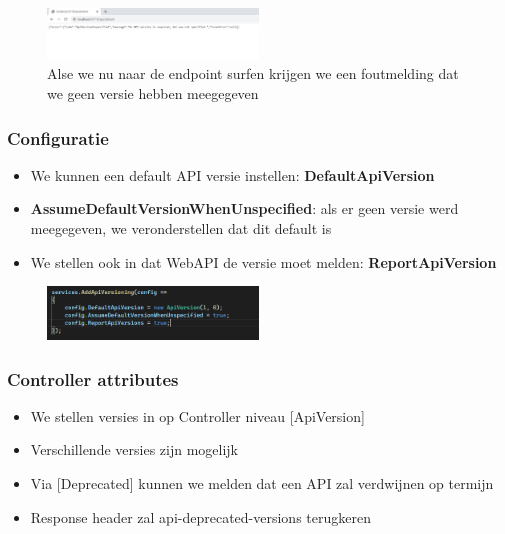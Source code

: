 \documentclass{article}
\begin{document}
\begin{figure}[H]
    \centering
    \includegraphics[width=0.5\textwidth]{versioning-browser.png}
    \caption{Alse we nu naar de endpoint surfen krijgen we een foutmelding dat we geen versie hebben meegegeven}
\end{figure}

\subsubsection{Configuratie}

\begin{itemize}
    \item We kunnen een default API versie instellen: \textbf{DefaultApiVersion}
    \item \textbf{AssumeDefaultVersionWhenUnspecified}: als er geen versie werd meegegeven, we veronderstellen dat dit default is
    \item We stellen ook in dat WebAPI de versie moet melden: \textbf{ReportApiVersion}
\end{itemize}

\begin{figure}[H]
    \centering
    \includegraphics[width=0.5\textwidth]{versioning-addapiversioning.png}
    \caption{}
\end{figure}

\subsubsection{Controller attributes}

\begin{itemize}
    \item We stellen versies in op Controller niveau [ApiVersion]
    \item Verschillende versies zijn mogelijk
    \item Via [Deprecated] kunnen we melden dat een API zal verdwijnen op termijn
    \item Response header zal api-deprecated-versions terugkeren
\end{itemize}
\end{document}
